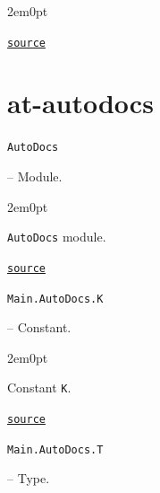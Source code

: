 \begin{adjustwidth}{2em}{0pt}


\href{https://example.org/Repository.jl/blob/make.jl#L44-74}{\texttt{source}}


\end{adjustwidth}

\section{at-autodocs}



\label{16936460559943580189}{}

\hypertarget{16879173417511789030}{\texttt{AutoDocs}}  -- {Module.}

\begin{adjustwidth}{2em}{0pt}

\texttt{AutoDocs} module.



\href{https://example.org/Repository.jl/blob/make.jl#L78-78}{\texttt{source}}


\end{adjustwidth}
\hypertarget{14331794103905141259}{\texttt{Main.AutoDocs.K}}  -- {Constant.}

\begin{adjustwidth}{2em}{0pt}

Constant \texttt{K}.



\href{https://example.org/Repository.jl/blob/make.jl#L91-91}{\texttt{source}}


\end{adjustwidth}
\hypertarget{14540866538501586877}{\texttt{Main.AutoDocs.T}}  -- {Type.}

